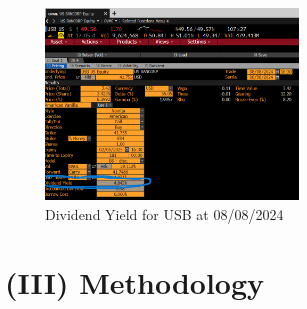 \documentclass[12pt,a4paper]{article}
\begin{document}
\begin{enumerate}
\begin{figure}[H]
    \centering
    \includegraphics[width=0.6\textwidth, height=0.3\textheight]{Images/div.png}
    \caption{Dividend Yield for USB at 08/08/2024}
    \label{fig:yourlabel}
\end{figure}
\end{enumerate}

\section*{(III) Methodology}
\end{document}
